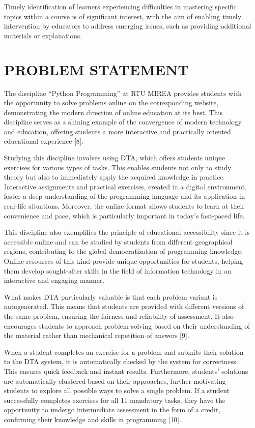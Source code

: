 \documentclass{article}
\begin{document}
\begin{multicols}{2}
\begin{justify}
      Timely identification of learners experiencing difficulties in mastering specific topics within a course is of significant interest, with the aim of enabling timely intervention by educators to address emerging issues, such as providing additional materials or explanations.
      
      \section{PROBLEM STATEMENT}
      The discipline “Python Programming” at RTU MIREA provides students with the opportunity to solve problems online on the corresponding website, demonstrating the modern direction of online education at its best. This discipline serves as a shining example of the convergence of modern technology and education, offering students a more interactive and practically oriented educational experience [8].

      Studying this discipline involves using DTA, which offers students unique exercises for various types of tasks. This enables students not only to study theory but also to immediately apply the acquired knowledge in practice. Interactive assignments and practical exercises, created in a digital environment, foster a deep understanding of the programming language and its application in real-life situations. Moreover, the online format allows students to learn at their convenience and pace, which is particularly important in today's fast-paced life.

      This discipline also exemplifies the principle of educational accessibility since it is accessible online and can be studied by students from different geographical regions, contributing to the global democratization of programming knowledge. Online resources of this kind provide unique opportunities for students, helping them develop sought-after skills in the field of information technology in an interactive and engaging manner.

      What makes DTA particularly valuable is that each problem variant is autogenerated. This means that students are provided with different versions of the same problem, ensuring the fairness and reliability of assessment. It also encourages students to approach problem-solving based on their understanding of the material rather than mechanical repetition of answers [9].

      When a student completes an exercise for a problem and submits their solution to the DTA system, it is automatically checked by the system for correctness. This ensures quick feedback and instant results. Furthermore, students' solutions are automatically clustered based on their approaches, further motivating students to explore all possible ways to solve a single problem. If a student successfully completes exercises for all 11 mandatory tasks, they have the opportunity to undergo intermediate assessment in the form of a credit, confirming their knowledge and skills in programming [10].


\end{justify}
\end{multicols}
\end{document}
